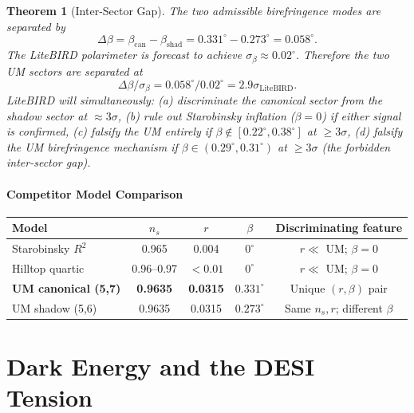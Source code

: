 \documentclass[12pt,a4paper]{article}
\newtheorem{theorem}{Theorem}[section]
\begin{document}
\begin{theorem}[Inter-Sector Gap]
  The two admissible birefringence modes are separated by
  \begin{equation}
    \Delta\beta = \beta_\mathrm{can} - \beta_\mathrm{shad}
                = 0.331^\circ - 0.273^\circ = 0.058^\circ.
  \end{equation}
  The LiteBIRD polarimeter \citep{LiteBIRD2023} is forecast to achieve
  $\sigma_\beta \approx 0.02^\circ$.  Therefore the two UM sectors are
  separated at
  \begin{equation}
    \Delta\beta / \sigma_\beta = 0.058^\circ / 0.02^\circ = 2.9\sigma_\mathrm{LiteBIRD}.
  \end{equation}
  LiteBIRD will simultaneously:
  (a) discriminate the canonical sector from the shadow sector at $\approx 3\sigma$,
  (b) rule out Starobinsky inflation ($\beta = 0$) if either signal is confirmed,
  (c) falsify the UM entirely if $\beta \notin [0.22^\circ, 0.38^\circ]$ at $\geq 3\sigma$,
  (d) falsify the UM birefringence mechanism if $\beta \in (0.29^\circ, 0.31^\circ)$
      at $\geq 3\sigma$ (the forbidden inter-sector gap).
\end{theorem}

\subsection{Competitor Model Comparison}

\begin{center}
\begin{tabular}{lcccc}
\hline
Model & $n_s$ & $r$ & $\beta$ & Discriminating feature \\
\hline
Starobinsky $R^2$ & 0.965 & 0.004 & $0^\circ$ & $r \ll$ UM; $\beta = 0$ \\
Hilltop quartic & 0.96--0.97 & $<0.01$ & $0^\circ$ & $r \ll$ UM; $\beta = 0$ \\
\textbf{UM canonical (5,7)} & \textbf{0.9635} & \textbf{0.0315} & $\mathbf{0.331^\circ}$ & Unique $(r,\beta)$ pair \\
UM shadow (5,6) & 0.9635 & 0.0315 & $0.273^\circ$ & Same $n_s, r$; different $\beta$ \\
\hline
\end{tabular}
\end{center}

\part{Dark Energy and the DESI Tension}
\end{document}
